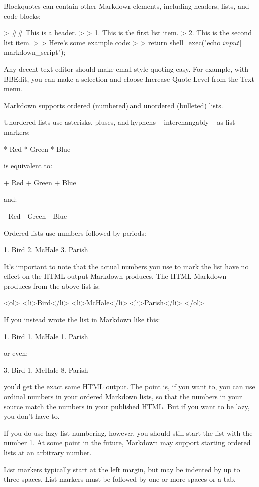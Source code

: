 Blockquotes can contain other Markdown elements, including headers, lists, and code blocks:

	> ## This is a header.
	> 
	> 1.   This is the first list item.
	> 2.   This is the second list item.
	> 
	> Here's some example code:
	> 
	>     return shell_exec("echo $input | $markdown_script");

Any decent text editor should make email-style quoting easy. For example, with BBEdit, you can make a selection and choose Increase Quote Level from the Text menu.

Markdown supports ordered (numbered) and unordered (bulleted) lists.

Unordered lists use asterisks, pluses, and hyphens -- interchangably
-- as list markers:

    *   Red
    *   Green
    *   Blue

is equivalent to:

    +   Red
    +   Green
    +   Blue

and:

    -   Red
    -   Green
    -   Blue

Ordered lists use numbers followed by periods:

    1.  Bird
    2.  McHale
    3.  Parish

It's important to note that the actual numbers you use to mark the list have no effect on the HTML output Markdown produces. The HTML Markdown produces from the above list is:

    <ol>
    <li>Bird</li>
    <li>McHale</li>
    <li>Parish</li>
    </ol>

If you instead wrote the list in Markdown like this:

    1.  Bird
    1.  McHale
    1.  Parish

or even:

    3. Bird
    1. McHale
    8. Parish

you'd get the exact same HTML output. The point is, if you want to, you can use ordinal numbers in your ordered Markdown lists, so that the numbers in your source match the numbers in your published HTML. But if you want to be lazy, you don't have to.

If you do use lazy list numbering, however, you should still start the list with the number 1. At some point in the future, Markdown may support starting ordered lists at an arbitrary number.

List markers typically start at the left margin, but may be indented by up to three spaces. List markers must be followed by one or more spaces or a tab.

